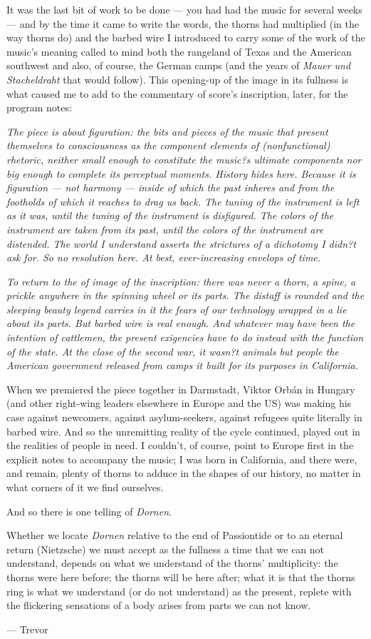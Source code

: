 \documentclass[11pt]{article}
\begin{document}
It was the last bit of work to be done --- you had had the music for several weeks --- and by the time it came to write the words, the thorns had multiplied (in the way thorns do) and the barbed wire I introduced to carry some of the work of the music's meaning called to mind both the rangeland of Texas and the American southwest and also, of course, the German camps (and the years of \textit{Mauer und Stacheldraht} that would follow). This opening-up of the image in its fullness is what caused me to add to the commentary of score's inscription, later, for the program notes:

\textit{The piece is about figuration: the bits and pieces of the music that present themselves to consciousness as the component elements of (nonfunctional) rhetoric, neither small enough to constitute the music?s ultimate components nor big enough to complete its perceptual moments. History hides here. Because it is figuration --- not harmony --- inside of which the past inheres and from the footholds of which it reaches to drag us back. The tuning of the instrument is left as it was, until the tuning of the instrument is disfigured. The colors of the instrument are taken from its past, until the colors of the instrument are distended. The world I understand asserts the strictures of a dichotomy I didn?t ask for. So no resolution here. At best, ever-increasing envelops of time.}

\textit{To return to the of image of the inscription: there was never a thorn, a spine, a prickle anywhere in the spinning wheel or its parts. The distaff is rounded and the sleeping beauty legend carries in it the fears of our technology wrapped in a lie about its parts. But barbed wire is real enough. And whatever may have been the intention of cattlemen, the present exigencies have to do instead with the function of the state. At the close of the second war, it wasn?t animals but people the American government released from camps it built for its purposes in California.}

When we premiered the piece together in Darmstadt, Viktor Orb\'{a}n in Hungary (and other right-wing leaders elsewhere in Europe and the US) was making his case against newcomers, against asylum-seekers, against refugees quite literally in barbed wire. And so the unremitting reality of the cycle continued, played out in the realities of people in need. I couldn't, of course, point to Europe first in the explicit notes to accompany the music; I was born in California, and there were, and remain, plenty of thorns to adduce in the shapes of our history, no matter in what corners of it we find ourselves.

And so there is one telling of \textit{Dornen}.

Whether we locate \textit{Dornen} relative to the end of Passiontide or to an eternal return (Nietzsche) we must accept as the fullness a time that we can not understand, depends on what we understand of the thorns' multiplicity: the thorns were here before; the thorns will be here after; what it is that the thorns ring is what we understand (or do not understand) as the present, replete with the flickering sensations of a body arises from parts we can not know.

\vspace {10 mm}

\hfill--- Trevor
\end{document}
